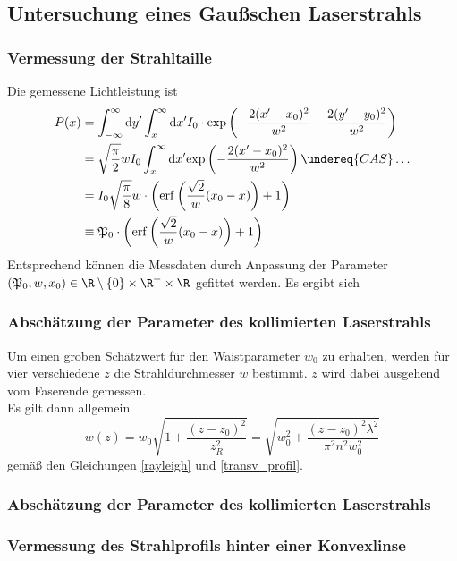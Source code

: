 \documentclass[11pt,a4paper,oneside]{scrartcl}
\begin{document}
\subsection{Untersuchung eines Gaußschen Laserstrahls}
\subsubsection{Vermessung der Strahltaille}
Die gemessene Lichtleistung ist 
\begin{align}
P(x)&=\int_{-\infty}^\infty \mathrm dy^\prime \int_x^\infty \mathrm dx^\prime I_0\cdot\mathrm{exp}\left(-\frac{2(x^\prime-x_0)^2}{w^2}-\frac{2(y^\prime-y_0)^2}{w^2}\right) \\ \quad& = \sqrt{\frac{\pi}{2}}wI_0\int_x^\infty \mathrm dx^\prime \mathrm{exp}\left(-\frac{2(x^\prime-x_0)^2}{w^2}\right) \undereq{CAS}\hdots \\ \quad& =I_0\sqrt{\frac{\pi}{8}}w\cdot\left(\mathrm{erf}\left(\frac{\sqrt{2}}{w}(x_0-x)\right)+1\right)\\ \quad& \equiv \mathfrak{P}_0\cdot\left(\mathrm{erf}\left(\frac{\sqrt{2}}{w}(x_0-x)\right)+1\right)
\end{align}
Entsprechend können die Messdaten durch Anpassung der Parameter $(\mathfrak P_0,w,x_0)\in \R\setminus\{0\}\times\R^+\times\R$ gefittet werden.
Es ergibt sich 
\subsubsection{Abschätzung der Parameter des kollimierten Laserstrahls}
Um einen groben Schätzwert für den Waistparameter $w_0$ zu erhalten, werden für vier verschiedene $z$ die Strahldurchmesser $w$ bestimmt. $z$ wird dabei ausgehend vom Faserende gemessen. \\
Es gilt dann allgemein
\begin{equation}\label{w(z)}
w(z)=w_0\sqrt{1+\frac{(z-z_0)^2}{z_R^2}}=\sqrt{w_0^2+\frac{(z-z_0)^2\lambda^2}{\pi^2n^2w_0^2}}
\end{equation}
gemäß den Gleichungen \ref{rayleigh} und \ref{transv_profil}. 
\subsubsection{Abschätzung der Parameter des kollimierten Laserstrahls}
\subsubsection{Vermessung des Strahlprofils hinter einer Konvexlinse}
\end{document}
